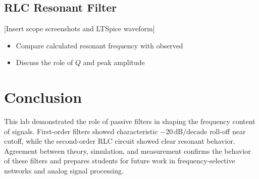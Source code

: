 \documentclass[12pt]{article}
\begin{document}
\subsection{RLC Resonant Filter}
[Insert scope screenshots and LTSpice waveform]
\begin{itemize}
	\item Compare calculated resonant frequency with observed
	\item Discuss the role of $Q$ and peak amplitude
\end{itemize}

\section{Conclusion}
This lab demonstrated the role of passive filters in shaping the frequency content of signals. First-order filters showed characteristic $-20\,\mathrm{dB/decade}$ roll-off near cutoff, while the second-order RLC circuit showed clear resonant behavior. Agreement between theory, simulation, and measurement confirms the behavior of these filters and prepares students for future work in frequency-selective networks and analog signal processing.
\end{document}
